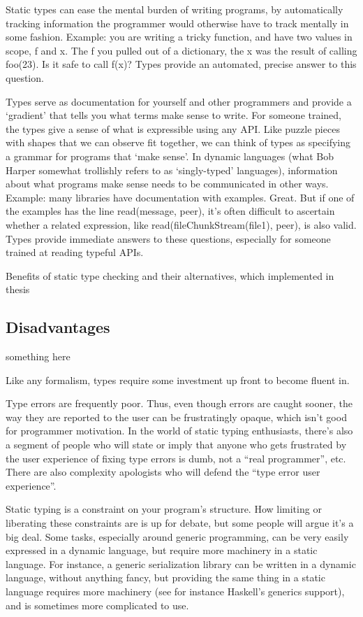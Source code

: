 Static types can ease the mental burden of writing programs, by automatically
tracking information the programmer would otherwise have to track mentally in
some fashion. Example: you are writing a tricky function, and have two values in
scope, f and x. The f you pulled out of a dictionary, the x was the result of
calling foo(23). Is it safe to call f(x)? Types provide an automated, precise
answer to this question.

Types serve as documentation for yourself and other programmers and provide a
‘gradient’ that tells you what terms make sense to write. For someone trained,
the types give a sense of what is expressible using any API. Like puzzle pieces
with shapes that we can observe fit together, we can think of types as
specifying a grammar for programs that ‘make sense’. In dynamic languages (what
Bob Harper somewhat trollishly refers to as ‘singly-typed’ languages),
information about what programs make sense needs to be communicated in other
ways. Example: many libraries have documentation with examples. Great. But if
one of the examples has the line read(message, peer), it’s often difficult to
ascertain whether a related expression, like read(fileChunkStream(file1), peer),
is also valid. Types provide immediate answers to these questions, especially
for someone trained at reading typeful APIs.


Benefits of static type checking and their alternatives, which implemented in thesis
\cite{staticvsdynamic}
\subsection{Disadvantages}
something here

Like any formalism, types require some investment up front to become fluent in.

Type errors are frequently poor. Thus, even though errors are caught sooner, the
way they are reported to the user can be frustratingly opaque, which isn’t good
for programmer motivation. In the world of static typing enthusiasts, there’s
also a segment of people who will state or imply that anyone who gets frustrated
by the user experience of fixing type errors is dumb, not a “real programmer”,
etc. There are also complexity apologists who will defend the “type error user
experience”.

Static typing is a constraint on your program’s structure. How limiting or
liberating these constraints are is up for debate, but some people will argue
it’s a big deal. Some tasks, especially around generic programming, can be very
easily expressed in a dynamic language, but require more machinery in a static
language. For instance, a generic serialization library can be written in a
dynamic language, without anything fancy, but providing the same thing in a
static language requires more machinery (see for instance Haskell’s generics
support), and is sometimes more complicated to use.


